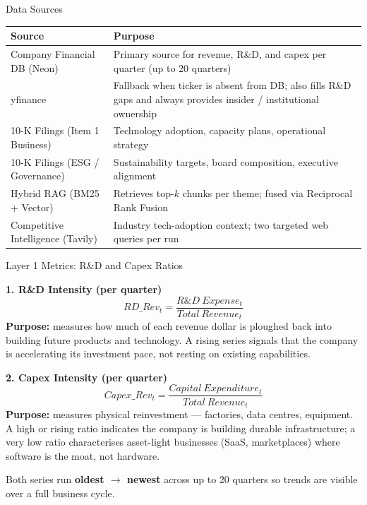 \documentclass[aspectratio=169]{beamer}
\begin{document}
\begin{frame}{Data Sources}
\small
\begin{table}[h]
\centering
\begin{tabular}{p{4.8cm} p{7.2cm}}
\hline
\textbf{Source} & \textbf{Purpose} \\
\hline
Company Financial DB (Neon) &
Primary source for revenue, R\&D, and capex per quarter
(up to 20 quarters) \\
yfinance &
Fallback when ticker is absent from DB; also fills R\&D gaps
and always provides insider / institutional ownership \\
10-K Filings (Item 1 Business) &
Technology adoption, capacity plans, operational strategy \\
10-K Filings (ESG / Governance) &
Sustainability targets, board composition, executive alignment \\
Hybrid RAG (BM25 + Vector) &
Retrieves top-$k$ chunks per theme; fused via Reciprocal Rank Fusion \\
Competitive Intelligence (Tavily) &
Industry tech-adoption context; two targeted web queries per run \\
\hline
\end{tabular}
\end{table}
\end{frame}

\begin{frame}{Layer 1 Metrics: R\&D and Capex Ratios}
\small

\textbf{1. R\&D Intensity (per quarter)}
\[
RD\_Rev_t = \frac{R\&D\ Expense_t}{Total\ Revenue_t}
\]
\textbf{Purpose:} measures how much of each revenue dollar is ploughed back into
building future products and technology. A rising series signals that the company
is accelerating its investment pace, not resting on existing capabilities.

\vspace{0.4cm}
\textbf{2. Capex Intensity (per quarter)}
\[
Capex\_Rev_t = \frac{Capital\ Expenditure_t}{Total\ Revenue_t}
\]
\textbf{Purpose:} measures physical reinvestment --- factories, data centres,
equipment. A high or rising ratio indicates the company is building durable
infrastructure; a very low ratio characterises asset-light businesses
(SaaS, marketplaces) where software is the moat, not hardware.

\vspace{0.3cm}
Both series run \textbf{oldest $\rightarrow$ newest} across up to 20 quarters so
trends are visible over a full business cycle.

\end{frame}
\end{document}
